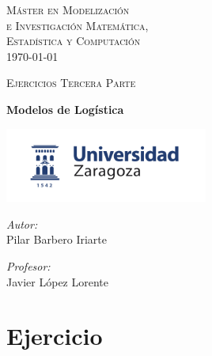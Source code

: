\documentclass[a4paper,12pt]{article}
\author{Pilar Barbero Iriarte}
\begin{document}
\begin{titlepage}
\begin{center}



\textsc{\LARGE M\'aster en Modelizaci\'on \\e Investigaci\'on Matem\'atica,\\ Estad\'istica y Computaci\'on }\\[1.5cm]
{\large \today}

\textsc{Ejercicios Tercera Parte}\\[0.5cm]

\vfill

{ \huge \bfseries Modelos de Log\'istica \\[0.4cm] }

\vfill


\includegraphics[width=0.5\textwidth]{../logoUZ.png}~\\[1cm]

\noindent
\begin{minipage}{0.4\textwidth}
\begin{flushleft} \large
\emph{Autor:}\\
Pilar Barbero Iriarte 
\end{flushleft}
\end{minipage}%
\begin{minipage}{0.4\textwidth}
\begin{flushright} \large
\emph{Profesor:} \\
Javier L\'opez Lorente
\end{flushright}
\end{minipage}

\end{center}


\end{titlepage}

\pagebreak
\tableofcontents
\pagebreak

\section{Ejercicio}
\end{document}
